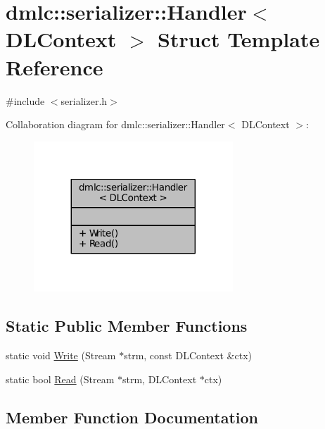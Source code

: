 \hypertarget{structdmlc_1_1serializer_1_1Handler_3_01DLContext_01_4}{}\section{dmlc\+:\+:serializer\+:\+:Handler$<$ D\+L\+Context $>$ Struct Template Reference}
\label{structdmlc_1_1serializer_1_1Handler_3_01DLContext_01_4}


{\ttfamily \#include $<$serializer.\+h$>$}



Collaboration diagram for dmlc\+:\+:serializer\+:\+:Handler$<$ D\+L\+Context $>$\+:
\nopagebreak
\begin{figure}[H]
\begin{center}
\leavevmode
\includegraphics[width=212pt]{structdmlc_1_1serializer_1_1Handler_3_01DLContext_01_4__coll__graph}
\end{center}
\end{figure}
\subsection*{Static Public Member Functions}
\begin{DoxyCompactItemize}
\item 
static void \hyperlink{structdmlc_1_1serializer_1_1Handler_3_01DLContext_01_4_ac8dbcc213076af862124b5e0fb744ca3}{Write} (Stream $\ast$strm, const D\+L\+Context \&ctx)
\item 
static bool \hyperlink{structdmlc_1_1serializer_1_1Handler_3_01DLContext_01_4_a70bfa519f093b32e7f3c649c6c334b30}{Read} (Stream $\ast$strm, D\+L\+Context $\ast$ctx)
\end{DoxyCompactItemize}


\subsection{Member Function Documentation}
